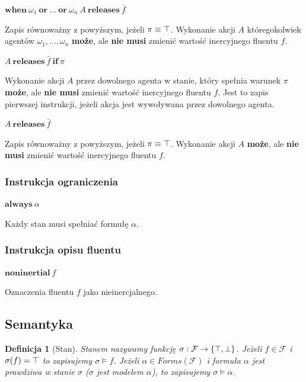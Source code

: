 \documentclass[11pt,a4paper]{article}
\newtheorem{definition}{Definicja}[section]
\def\tang{\ThisStyle{\abovebaseline[0pt]{\scalebox{-1}{$\SavedStyle\perp$}}}}
\begin{document}
    \begin{center}
        $\mathbf{when}~\omega_1~\mathbf{or}~...~\mathbf{or}~\omega_n~A~\mathbf{releases}~\bar{f}$
    \end{center}
    Zapis równoważny z powyższym, jeżeli $\pi \equiv \tang$. Wykonanie akcji $A$ któregokolwiek agentów $\omega_1, ..., \omega_n$ \textbf{może}, ale \textbf{nie musi} zmienić wartość inercyjnego fluentu $f$.
    
    \begin{center}
        $A~\mathbf{releases}~\bar{f}~\mathbf{if}~\pi$
    \end{center}
    Wykonanie akcji $A$ przez dowolnego agenta w stanie, który spełnia warunek $\pi$ \textbf{może}, ale \textbf{nie musi} zmienić wartość inercyjnego fluentu $f$. Jest to zapis pierwszej instrukcji, jeżeli akcja jest wywoływana przez dowolnego agenta.
    
    \begin{center}
        $A~\mathbf{releases}~\bar{f}$
    \end{center}
    Zapis równoważny z powyższym, jeżeli $\pi \equiv \tang$. Wykonanie akcji $A$ \textbf{może}, ale \textbf{nie musi} zmienić wartość inercyjnego fluentu $f$.
    
    \subsubsection{Instrukcja ograniczenia}    
   
    \begin{center}
        $\mathbf{always}~\alpha$
    \end{center}
    Każdy stan musi spełniać formułę $\alpha$.
    
    \subsubsection{Instrukcja opisu fluentu}
    \begin{center}
        $\mathbf{noninertial}~f$
    \end{center}
    Oznaczenia fluentu $f$ jako nieinercjalnego.
    
    \subsection{Semantyka}
    
    \begin{definition}[Stan]
    Stanem nazywamy funkcję $\sigma: \mathcal{F} \rightarrow \{\tang, \perp\}$.
    Jeżeli $f \in \mathcal{F}$ i $\sigma(f)=\tang$ to zapisujemy $\sigma \models f$.
    Jeżeli $\alpha \in Forms(\mathcal{F})$ i formuła $\alpha$ jest prawdziwa w stanie $\sigma$ ($\sigma$ jest modelem $\alpha$), to zapisujemy $\sigma \models \alpha$.
    \end{definition}
    
\end{document}
